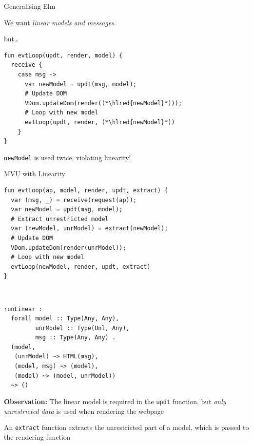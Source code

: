 \documentclass[11.5pt, aspectratio=169]{beamer}
\begin{document}
\begin{frame}[fragile]{Generalising Elm}

  \begin{fullpageitemize}
  \item We want \emph{linear models and messages}.
    \begin{itemize}
      \itemR but\ldots
    \end{itemize}
  \end{fullpageitemize}

  \begin{lstlisting}[language=links]
fun evtLoop(updt, render, model) {
  receive {
    case msg ->
      var newModel = updt(msg, model);
      # Update DOM
      VDom.updateDom(render((*\hlred{newModel}*)));
      # Loop with new model
      evtLoop(updt, render, (*\hlred{newModel}*))
    }
}
  \end{lstlisting}

  \begin{fullpageitemize}
    \item \texttt{newModel} is used twice, violating linearity!
  \end{fullpageitemize}
\end{frame}

\begin{frame}[fragile]{MVU with Linearity}

\begin{minipage}{0.55\textwidth}
  \begin{lstlisting}[language=links]
fun evtLoop(ap, model, render, updt, extract) {
  var (msg, _) = receive(request(ap));
  var newModel = updt(msg, model);
  # Extract unrestricted model
  var (newModel, unrModel) = extract(newModel);
  # Update DOM
  VDom.updateDom(render(unrModel));
  # Loop with new model
  evtLoop(newModel, render, updt, extract)
}
  \end{lstlisting}
\end{minipage}
~
\begin{minipage}{0.42\textwidth}
\begin{verbatim}
runLinear :
  forall model :: Type(Any, Any),
         unrModel :: Type(Unl, Any),
         msg :: Type(Any, Any) .
  (model,
   (unrModel) ~> HTML(msg),
   (model, msg) ~> (model),
   (model) ~> (model, unrModel))
  ~> ()
\end{verbatim}
\end{minipage}

  \begin{fullpageitemize}
  \item \textbf{Observation:} The linear model is required in the \texttt{updt} function, but \emph{only unrestricted data} is used when rendering the webpage
    \begin{itemize}
      \itemR An \texttt{extract} function extracts the unrestricted part of a model, which is passed to the rendering function
    \end{itemize}
  \end{fullpageitemize}
\end{frame}
\end{document}
